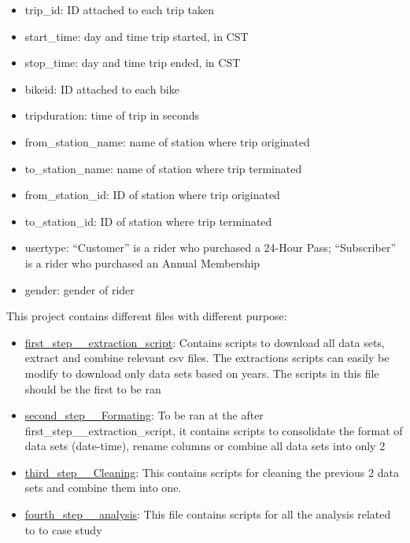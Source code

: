 \documentclass[
]{article}
\providecommand{\tightlist}{%
  \setlength{\itemsep}{0pt}\setlength{\parskip}{0pt}}
\begin{document}
\begin{itemize}
\tightlist
\item
  trip\_id: ID attached to each trip taken
\item
  start\_time: day and time trip started, in CST
\item
  stop\_time: day and time trip ended, in CST
\item
  bikeid: ID attached to each bike
\item
  tripduration: time of trip in seconds
\item
  from\_station\_name: name of station where trip originated
\item
  to\_station\_name: name of station where trip terminated
\item
  from\_station\_id: ID of station where trip originated
\item
  to\_station\_id: ID of station where trip terminated
\item
  usertype: ``Customer'' is a rider who purchased a 24-Hour Pass;
  ``Subscriber'' is a rider who purchased an Annual Membership
\item
  gender: gender of rider
\end{itemize}

This project contains different files with different purpose:

\begin{itemize}
\tightlist
\item
  \href{https://github.com/bationoA/How_does_a_bike_share_navigate_speedy_success/blob/main/first_step__extraction_script.Rmd}{first\_step\_\_extraction\_script}:
  Contains scripts to download all data sets, extract and combine
  relevant csv files. The extractions scripts can easily be modify to
  download only data sets based on years. The scripts in this file
  should be the first to be ran
\item
  \href{https://github.com/bationoA/How_does_a_bike_share_navigate_speedy_success/blob/main/second_step__Formating.Rmd}{second\_step\_\_Formating}:
  To be ran at the after first\_step\_\_extraction\_script, it contains
  scripts to consolidate the format of data sets (date-time), rename
  columns or combine all data sets into only 2
\item
  \href{https://github.com/bationoA/How_does_a_bike_share_navigate_speedy_success/blob/main/third_step__Cleaning.Rmd}{third\_step\_\_Cleaning}:
  This contains scripts for cleaning the previous 2 data sets and
  combine them into one.
\item
  \href{https://github.com/bationoA/How_does_a_bike_share_navigate_speedy_success/blob/main/fourth_step__analysis.Rmd}{fourth\_step\_\_analysis}:
  This file contains scripts for all the analysis related to to case
  study
\end{itemize}
\end{document}
